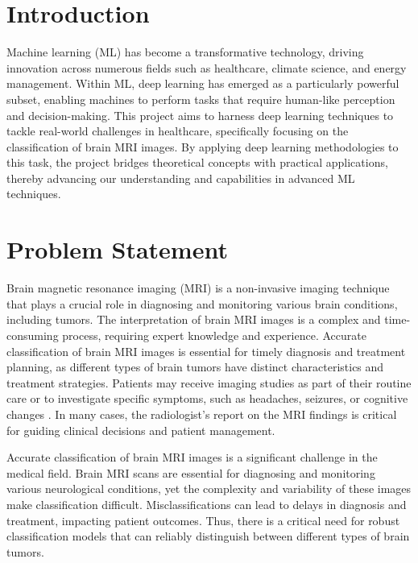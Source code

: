 \section{Introduction}\label{s:introduction}

Machine learning (ML) has become a transformative technology, driving innovation across numerous fields such as healthcare, climate science, and energy management. Within ML, deep learning has emerged as a particularly powerful subset, enabling machines to perform tasks that require human-like perception and decision-making. This project aims to harness deep learning techniques to tackle real-world challenges in healthcare, specifically focusing on the classification of brain MRI images. By applying deep learning methodologies to this task, the project bridges theoretical concepts with practical applications, thereby advancing our understanding and capabilities in advanced ML techniques.

\section{Problem Statement}\label{s:problem-statement}

Brain magnetic resonance imaging (MRI) is a non-invasive imaging technique that plays a crucial role in diagnosing and monitoring various brain conditions, including tumors. The interpretation of brain MRI images is a complex and time-consuming process, requiring expert knowledge and experience. Accurate classification of brain MRI images is essential for timely diagnosis and treatment planning, as different types of brain tumors have distinct characteristics and treatment strategies. Patients may receive imaging studies as part of their routine care or to investigate specific symptoms, such as headaches, seizures, or cognitive changes \cite{lapointe_primary_2018}. In many cases, the radiologist's report on the MRI findings is critical for guiding clinical decisions and patient management.

Accurate classification of brain MRI images is a significant challenge in the medical field. Brain MRI scans are essential for diagnosing and monitoring various neurological conditions, yet the complexity and variability of these images make classification difficult. Misclassifications can lead to delays in diagnosis and treatment, impacting patient outcomes. Thus, there is a critical need for robust classification models that can reliably distinguish between different types of brain tumors.

